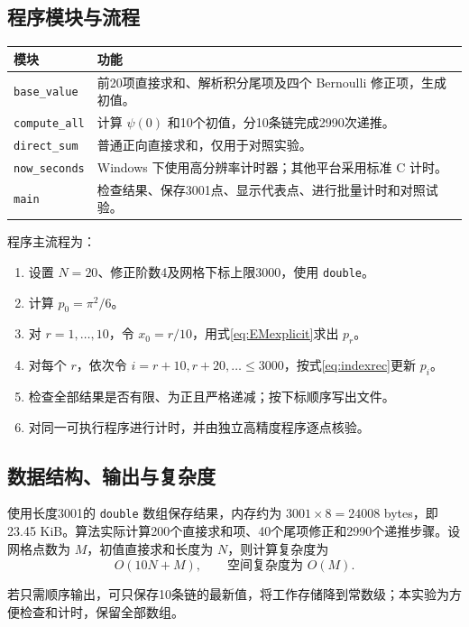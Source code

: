 \documentclass[UTF8,fontset=fandol,zihao=-4,a4paper]{ctexart}
\newcommand{\psif}{\psi}
\begin{document}
\subsection{程序模块与流程}
\begin{center}
\begin{tabular}{p{3.4cm}p{10.6cm}}
\toprule
模块 & 功能\\
\midrule
\texttt{base\_value} & 前20项直接求和、解析积分尾项及四个 Bernoulli 修正项，生成初值。\\
\texttt{compute\_all} & 计算 $\psif(0)$ 和10个初值，分10条链完成2990次递推。\\
\texttt{direct\_sum} & 普通正向直接求和，仅用于对照实验。\\
\texttt{now\_seconds} & Windows 下使用高分辨率计时器；其他平台采用标准 C 计时。\\
\texttt{main} & 检查结果、保存3001点、显示代表点、进行批量计时和对照试验。\\
\bottomrule
\end{tabular}
\end{center}

程序主流程为：
\begin{enumerate}
 \item 设置 $N=20$、修正阶数4及网格下标上限3000，使用 \texttt{double}。
 \item 计算 $p_0=\pi^2/6$。
 \item 对 $r=1,\ldots,10$，令 $x_0=r/10$，用式\eqref{eq:EMexplicit}求出 $p_r$。
 \item 对每个 $r$，依次令 $i=r+10,r+20,\ldots\le3000$，按式\eqref{eq:indexrec}更新 $p_i$。
 \item 检查全部结果是否有限、为正且严格递减；按下标顺序写出文件。
 \item 对同一可执行程序进行计时，并由独立高精度程序逐点核验。
\end{enumerate}



\subsection{数据结构、输出与复杂度}
使用长度3001的 \texttt{double} 数组保存结果，内存约为 $3001\times8=24008$ bytes，即23.45 KiB。算法实际计算200个直接求和项、40个尾项修正和2990个递推步骤。设网格点数为 $M$，初值直接求和长度为 $N$，则计算复杂度为
\[
 O(10N+M),\qquad \text{空间复杂度为 }O(M).
\]

若只需顺序输出，可只保存10条链的最新值，将工作存储降到常数级；本实验为方便检查和计时，保留全部数组。
\end{document}
